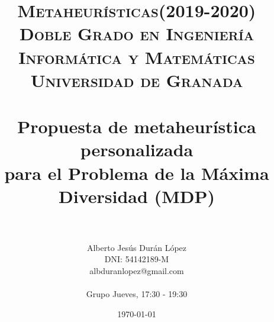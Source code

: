 

\usepackage{algpseudocode}
\usepackage[spanish]{babel}
\usepackage{varwidth}
\usepackage{hyperref}
\usepackage{graphicx}
\usepackage{epstopdf}


\usepackage[spanish,onelanguage]{algorithm2e} %
\usepackage[lmargin=3.81cm,tmargin=2.54cm,rmargin=2.54cm,bmargin=2.52cm]{geometry}
\usepackage{movie15}

\title{	
\normalfont \normalsize 
\textsc{\textbf{Metaheurísticas(2019-2020)} \\ Doble Grado en Ingeniería Informática y Matemáticas \\ Universidad de Granada} \\ [25pt] %
\horrule{0.5pt} \\[0.4cm] %
\huge Propuesta de metaheurística personalizada \\ para el Problema de la Máxima Diversidad  (MDP) \\ %
\horrule{2pt} \\[0.5cm] %
}
\usepackage{movie15}
\author{Alberto Jesús Durán López \\ 
DNI: 54142189-M \\
albduranlopez@gmail.com \\
\hfill \break \hspace{1cm}\\
Grupo Jueves, 17:30 - 19:30 } %


\date{\normalsize\today} %




\maketitle %

\newpage %

\tableofcontents %

